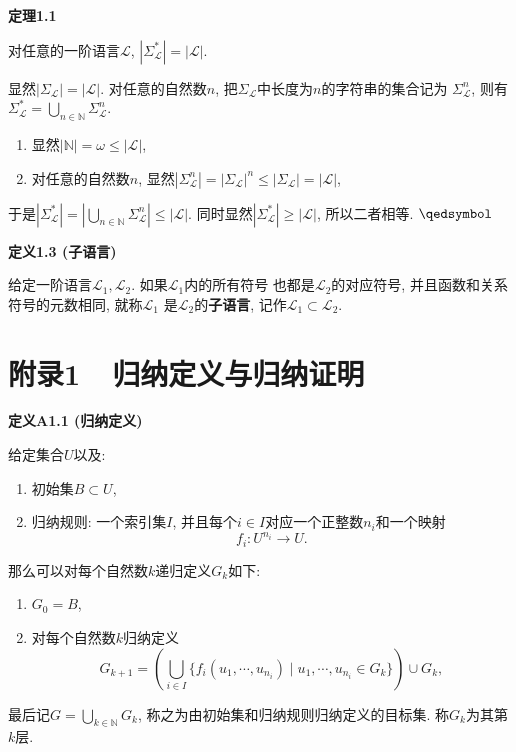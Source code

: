 \documentclass[UTF8]{ctexart}
\begin{document}
\hypertarget{sec:定理1.1}{}
\noindent\textbf{定理1.1}

对任意的一阶语言$\mathcal{L}$, $|\Sigma_{\mathcal{L}}^*|=|\mathcal{L}|$.


显然$|\Sigma_{\mathcal{L}}|=|\mathcal{L}|$.
对任意的自然数$n$, 把$\Sigma_{\mathcal{L}}$中长度为$n$的字符串的集合记为
$\Sigma_{\mathcal{L}}^n$, 则有$\displaystyle\Sigma_{\mathcal{L}}^*=
\bigcup_{n\in\mathbb{N}}\Sigma_{\mathcal{L}}^n$.
\begin{enumerate}
    \item 显然$|\mathbb{N}|=\omega\leqslant|\mathcal{L}|$,
    \item 对任意的自然数$n$, 显然$|\Sigma_{\mathcal{L}}^n|=
    |\Sigma_{\mathcal{L}}|^n\leqslant|\Sigma_{\mathcal{L}}|=|\mathcal{L}|$,
\end{enumerate}
\vspace{3pt}
于是$\displaystyle|\Sigma_{\mathcal{L}}^*|=
\left|\bigcup_{n\in\mathbb{N}}\Sigma_{\mathcal{L}}^n\right|\leqslant|\mathcal{L}|$.
同时显然$|\Sigma_{\mathcal{L}}^*|\geqslant|\mathcal{L}|$, 所以二者相等.
\hfill $\qedsymbol$

\vspace{10pt}

\hypertarget{sec:定义1.3}{}
\noindent\textbf{定义1.3 (子语言)}

给定一阶语言$\mathcal{L}_1,\mathcal{L}_2$. 如果$\mathcal{L}_1$内的所有符号
也都是$\mathcal{L}_2$的对应符号, 并且函数和关系符号的元数相同, 就称$\mathcal{L}_1$
是$\mathcal{L}_2$的\textbf{子语言}, 记作$\mathcal{L}_1\subset\mathcal{L}_2$.





\newpage

\section*{附录1\ \ 归纳定义与归纳证明}

\hypertarget{sec:定义A1.1}{}
\noindent\textbf{定义A1.1 (归纳定义)}

给定集合$U$以及:
\begin{enumerate}
    \item 初始集$B\subset U$,
    \item 归纳规则: 一个索引集$I$, 并且每个$i\in I$对应一个正整数$n_i$和一个映射
    \[
        f_i:U^{n_i}\to U.
    \]
\end{enumerate}
那么可以对每个自然数$k$递归定义$G_k$如下:
\begin{enumerate}
    \item $G_0=B$,
    \item 对每个自然数$k$归纳定义
    \[
        G_{k+1}=\left(\bigcup_{i\in I}\{f_i(u_1,\cdots,u_{n_i})
        \mid u_1,\cdots,u_{n_i}\in G_k\}\right)\cup G_k,
    \]
\end{enumerate}
最后记$\displaystyle G=\bigcup_{k\in\mathbb{N}}G_k$,
称之为由初始集和归纳规则归纳定义的目标集. 称$G_k$为其第$k$层.
\end{document}
